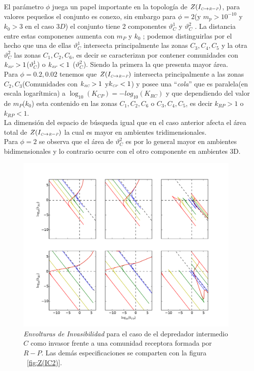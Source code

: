 El par\'ametro $\phi$ juega un papel importante en la topolog\'ia de $Z(I_{\textit{\tiny C} \to \textit{\tiny R} - \textit{\tiny P}})$, para valores peque\~nos el conjunto es conexo, sin embargo para $\phi = 2$(y $m_p>10^{-10}$ y $k_0 > 3$ en el caso $3D$) el conjunto tiene 2 componentes $\vartheta_C^1$ y $\vartheta_C^2$ . La distancia entre estas componenes aumenta con $m_P$ y $k_0$ ; podemos distinguirlas por el hecho que una de ellas $\vartheta_C^1$ intersecta principalmente las zonas $C_3,C_4,C_5$ y la otra $\vartheta_C^2$ las zonas $C_1,C_2,C_6$, es decir se caracterizan por contener comunidades con $k_{\textit{\tiny RP}} >1 $($\vartheta_C^1$) o $k_{\textit{\tiny RP}}<1$ ($\vartheta_C^2$). Siendo la primera la que presenta mayor \'area. \\
Para $\phi = 0.2 ,0.02$  tenemos que $Z(I_{\textit{\tiny C} \to \textit{\tiny R} - \textit{\tiny P}})$ intersecta principalmente a las zonas $C_2,C_3$(Comunidades con $k_{\textit{\tiny RC}}>1$ y$k_{\textit{\tiny CP}} <1$) y posee una ``\emph{cola}'' que es paralela(en escala logar\'itmica) a $\log_{10}(K_{CP}) = -log_{10}(K_{RC})$ y que dependiendo del valor de $m_P$($k_0$) esta contenido en las zonas $C_1,C_2,C_6$ o $C_3,C_4,C_5$, es decir $k_{RP} > 1$ o $k_{RP}<1$. \\

La dimensi\'on del espacio de b\'usqueda igual que en el caso anterior afecta el \'area total de $Z(I_{\textit{\tiny C} \to \textit{\tiny R} - \textit{\tiny P}})$ la cual es mayor en ambientes tridimensionales.\\
Para $\phi = 2$ se observa que el \'area de $\vartheta_C^2$ es por lo general mayor en ambientes bidimensionales y lo contrario ocurre con el otro componente en ambientes 3D.

\begin{figure}
  \centering
  \includegraphics[width = 0.99\textwidth]{./Plots/Z(IC5)AcGrGr.pdf}
  \caption[Env $Z(IC5)$]{\emph{Envolturas de Invasibilidad} para el caso de el depredador intermedio $C$ como invasor frente a una comunidad receptora formada por $R-P$. Las dem\'as especificaciones se comparten con la figura ~\ref{fig:Z(IC2)}.}
  \label{fig:Z(IC5)}
\end{figure}



